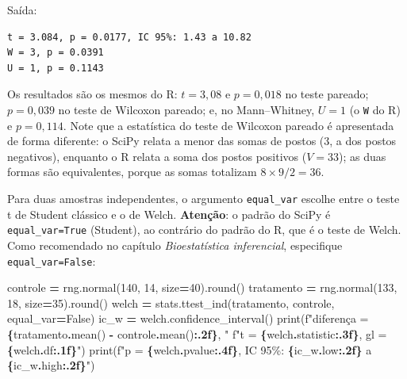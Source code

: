 \documentclass[
]{book}
\newenvironment{Shaded}{\begin{snugshade}}{\end{snugshade}}
\newcommand{\BuiltInTok}[1]{#1}
\newcommand{\DecValTok}[1]{\textcolor[rgb]{0.00,0.00,0.81}{#1}}
\newcommand{\NormalTok}[1]{#1}
\newcommand{\OperatorTok}[1]{\textcolor[rgb]{0.81,0.36,0.00}{\textbf{#1}}}
\newcommand{\SpecialCharTok}[1]{\textcolor[rgb]{0.81,0.36,0.00}{\textbf{#1}}}
\newcommand{\SpecialStringTok}[1]{\textcolor[rgb]{0.31,0.60,0.02}{#1}}
\newcommand{\VariableTok}[1]{\textcolor[rgb]{0.00,0.00,0.00}{#1}}
\begin{document}
Saída:

\begin{verbatim}
t = 3.084, p = 0.0177, IC 95%: 1.43 a 10.82
W = 3, p = 0.0391
U = 1, p = 0.1143
\end{verbatim}

Os resultados são os mesmos do R: \(t = 3{,}08\) e \(p = 0{,}018\) no teste pareado; \(p = 0{,}039\) no teste de Wilcoxon pareado; e, no Mann--Whitney, \(U = 1\) (o \texttt{W} do R) e \(p = 0{,}114\). Note que a estatística do teste de Wilcoxon pareado é apresentada de forma diferente: o SciPy relata a menor das somas de postos (3, a dos postos negativos), enquanto o R relata a soma dos postos positivos (\(V = 33\)); as duas formas são equivalentes, porque as somas totalizam \(8 \times 9/2 = 36\).

Para duas amostras independentes, o argumento \texttt{equal\_var} escolhe entre o teste t de Student clássico e o de Welch. \textbf{Atenção}: o padrão do SciPy é \texttt{equal\_var=True} (Student), ao contrário do padrão do R, que é o teste de Welch. Como recomendado no capítulo \emph{Bioestatística inferencial}, especifique \texttt{equal\_var=False}:

\begin{Shaded}
\begin{Highlighting}[]
\NormalTok{controle }\OperatorTok{=}\NormalTok{ rng.normal(}\DecValTok{140}\NormalTok{, }\DecValTok{14}\NormalTok{, size}\OperatorTok{=}\DecValTok{40}\NormalTok{).}\BuiltInTok{round}\NormalTok{()}
\NormalTok{tratamento }\OperatorTok{=}\NormalTok{ rng.normal(}\DecValTok{133}\NormalTok{, }\DecValTok{18}\NormalTok{, size}\OperatorTok{=}\DecValTok{35}\NormalTok{).}\BuiltInTok{round}\NormalTok{()}
\NormalTok{welch }\OperatorTok{=}\NormalTok{ stats.ttest\_ind(tratamento, controle, equal\_var}\OperatorTok{=}\VariableTok{False}\NormalTok{)}
\NormalTok{ic\_w }\OperatorTok{=}\NormalTok{ welch.confidence\_interval()}
\BuiltInTok{print}\NormalTok{(}\SpecialStringTok{f"diferença = }\SpecialCharTok{\{}\NormalTok{tratamento}\SpecialCharTok{.}\NormalTok{mean() }\OperatorTok{{-}}\NormalTok{ controle}\SpecialCharTok{.}\NormalTok{mean()}\SpecialCharTok{:.2f\}}\SpecialStringTok{, "}
      \SpecialStringTok{f"t = }\SpecialCharTok{\{}\NormalTok{welch}\SpecialCharTok{.}\NormalTok{statistic}\SpecialCharTok{:.3f\}}\SpecialStringTok{, gl = }\SpecialCharTok{\{}\NormalTok{welch}\SpecialCharTok{.}\NormalTok{df}\SpecialCharTok{:.1f\}}\SpecialStringTok{"}\NormalTok{)}
\BuiltInTok{print}\NormalTok{(}\SpecialStringTok{f"p = }\SpecialCharTok{\{}\NormalTok{welch}\SpecialCharTok{.}\NormalTok{pvalue}\SpecialCharTok{:.4f\}}\SpecialStringTok{, IC 95\%: }\SpecialCharTok{\{}\NormalTok{ic\_w}\SpecialCharTok{.}\NormalTok{low}\SpecialCharTok{:.2f\}}\SpecialStringTok{ a }\SpecialCharTok{\{}\NormalTok{ic\_w}\SpecialCharTok{.}\NormalTok{high}\SpecialCharTok{:.2f\}}\SpecialStringTok{"}\NormalTok{)}
\end{Highlighting}
\end{Shaded}
\end{document}
